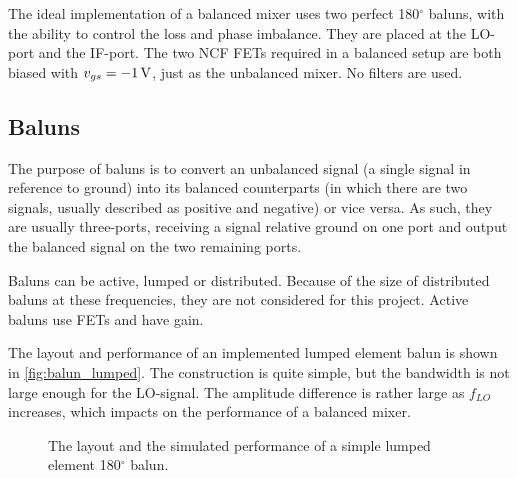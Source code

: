 			The ideal implementation of a balanced mixer uses two perfect 180$^\circ$ baluns, with the ability to control the loss and phase imbalance. They are placed at the LO-port and the IF-port. The two NCF FETs required in a balanced setup are both biased with $v_{gs}=\unit[-1]{V}$, just as the unbalanced mixer. No filters are used.

		\subsection{Baluns}
			The purpose of baluns is to convert an unbalanced signal (a single signal in reference to ground) into its balanced counterparts (in which there are two signals, usually described as positive and negative) or vice versa. As such, they are usually three-ports, receiving a signal relative ground on one port and output the balanced signal on the two remaining ports.

			Baluns can be active, lumped or distributed. Because of the size of distributed baluns at these frequencies, they are not considered for this project. Active baluns use FETs and have gain.

			The layout and performance of an implemented lumped element balun is shown in \autoref{fig:balun_lumped}.\autocite{kuylenstierna04} The construction is quite simple, but the bandwidth is not large enough for the LO-signal. The amplitude difference is rather large as $f_{LO}$ increases, which impacts on the performance of a balanced mixer.

			\begin{figure}[hpt!]
				\centering
				\caption{ The layout and  the simulated performance of a simple lumped element 180$^\circ$ balun.}\label{fig:balun_lumped}
			\end{figure}
%

